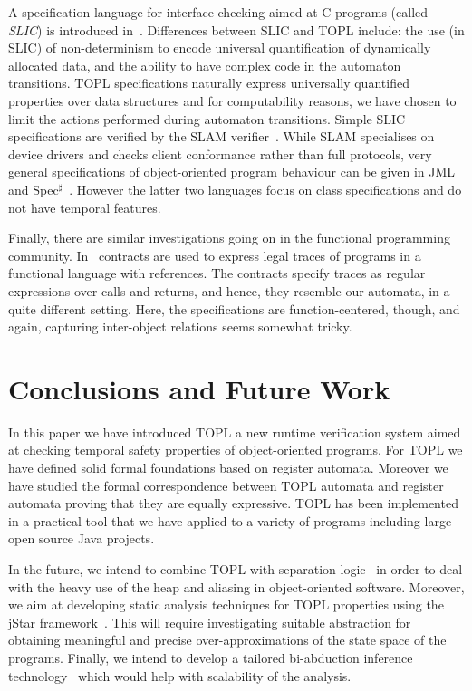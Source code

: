 \documentclass[9pt, preprint]{sigplanconf} %
\theoremstyle{definition}
\theoremstyle{remark}
\begin{document}
A specification language for interface checking aimed at C programs (called {\it SLIC\/}) is introduced in~\cite{ball2002}.
Differences between SLIC and TOPL include: the use (in SLIC) of non-determinism to encode universal quantification of dynamically allocated data, and the  ability to have complex code in the automaton transitions.
TOPL specifications naturally express universally quantified properties over data structures and for computability reasons,  we have chosen to limit the  actions performed during automaton transitions.
Simple SLIC specifications are verified by  the SLAM verifier~\cite{dblp:conf/cav/ballr01}.
While SLAM specialises on device drivers and checks client conformance rather than full protocols,
very general specifications of object-oriented program behaviour can be given in JML~\cite{jml} and Spec$^\sharp$~\cite{DBLP:journals/jot/BarnettDFLS04}. However the latter two languages focus on class specifications and do not have temporal features.

Finally, there are similar investigations going on in the functional programming community.
In~\cite{disney2011} contracts are used to express legal traces of programs in a functional language with references.
The contracts specify traces as regular expressions over calls and returns, and hence, they resemble our automata, in a quite different setting.
Here, the specifications are function-centered, though, and again, capturing inter-object relations seems somewhat tricky.

\section{Conclusions and Future Work}\label{sec:conclusions} %
In this paper we have introduced TOPL a new runtime verification system aimed at checking temporal safety properties of object-oriented programs. 
For TOPL we have defined solid formal foundations based on register automata. Moreover we have studied the formal correspondence between TOPL automata and register automata proving that they are equally expressive.
TOPL has been implemented in a practical tool that we have applied  to a variety of programs including large open source Java projects.
%

In the future, we intend to combine TOPL with  separation logic~\cite{reynolds2002} in order to deal with the heavy use of the heap and aliasing in object-oriented software.
Moreover, we aim at developing static analysis techniques for TOPL properties using the jStar framework~\cite{DBLP:conf/oopsla/DistefanoP08}.
This will require investigating suitable abstraction for obtaining meaningful and precise over-approximations of the state space of the programs.
Finally, we intend to develop a tailored bi-abduction inference technology~\cite{dblp:conf/popl/CalcagnoDOY09} which would help with scalability of the analysis.
\end{document}
